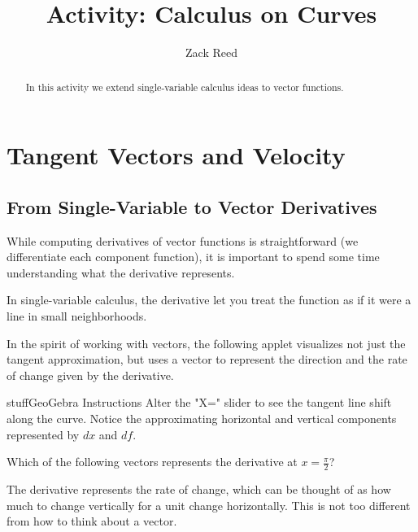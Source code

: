 \documentclass{ximera}
\title{Activity: Calculus on Curves}
\author{Zack Reed}
\begin{document}
\begin{abstract}
In this activity we extend single-variable calculus ideas to vector functions.
\end{abstract}
\maketitle

\section*{Tangent Vectors and Velocity}

\subsection*{From Single-Variable to Vector Derivatives}

While computing derivatives of vector functions is straightforward (we differentiate each component function), it is important to spend some time understanding what the derivative represents.

\begin{problem}
In single-variable calculus, the derivative let you treat the function as if it were a line in small neighborhoods.

In the spirit of working with vectors, the following applet visualizes not just the tangent approximation, but uses a vector to represent the direction and the rate of change given by the derivative.

\begin{expandable}{stuff}{GeoGebra Instructions}
    Alter the "X=" slider to see the tangent line shift along the curve. Notice the approximating horizontal and vertical components represented by $dx$ and $df$.
\end{expandable}

\begin{center}
\end{center}

Which of the following vectors represents the derivative at $x=\frac{\pi}{2}$?
\begin{multipleChoice}
    \choice{$[.55, 1]$}
    \choice[correct]{$[1, -.55]$}
    \choice{$[.55, -1]$}
    \choice{$[-1, .55]$}
\end{multipleChoice}
\begin{feedback}
The derivative represents the rate of change, which can be thought of as how much to change vertically for a unit change horizontally. This is not too different from how to think about a vector.
\end{feedback}
\end{problem}
\end{document}
